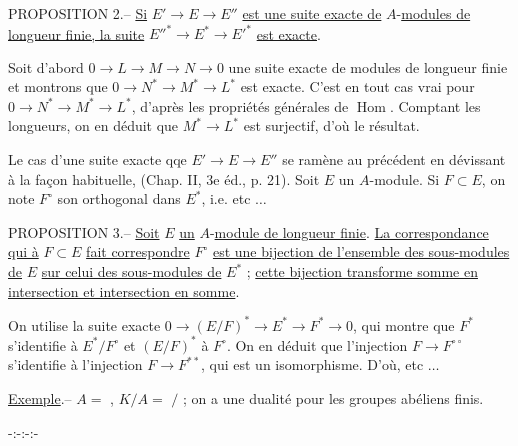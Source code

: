 PROPOSITION 2.-- \uline{Si} $E'\longrightarrow E\longrightarrow E''$ \uline{est une suite exacte de} $A$-\uline{modules de longueur finie, la suite} $E''^*\longrightarrow E^*\longrightarrow E'^*$ \uline{est exacte}.

Soit d'abord $0\longrightarrow L\longrightarrow M\longrightarrow N\longrightarrow0$ une suite exacte de modules de longueur finie et montrons que $0\longrightarrow N^*\longrightarrow M^*\longrightarrow L^*$ est exacte. C'est en tout cas vrai pour $0\longrightarrow N^*\longrightarrow M^*\longrightarrow L^*$, d'après les propriétés générales de $\operatorname{Hom}$. Comptant les longueurs, on en déduit que $M^*\longrightarrow L^*$ est surjectif, d'où le résultat.

Le cas d'une suite exacte qqe $E'\longrightarrow E\longrightarrow E''$ se ramène au précédent en dévissant à la façon habituelle, (Chap. II, 3e éd., p. 21). Soit $E$ un $A$-module. Si $F\subset E$, on note $F^{\circ}$ son orthogonal dans $E^*$, i.e. etc $\ldots$

PROPOSITION 3.-- \uline{Soit} $E$ \uline{un} $A$-\uline{module de longueur finie}. \uline{La correspondance qui à} $F\subset E$ \uline{fait correspondre} $F^{\circ}$ \uline{est une bijection de l'ensemble des sous-modules de} $E$ \uline{sur celui des sous-modules de} $E^*$ ; \uline{cette bijection transforme somme en intersection et intersection en somme}.

On utilise la suite exacte $0\longrightarrow(E/F)^*\longrightarrow E^*\longrightarrow F^*\longrightarrow0$, qui montre que $F^*$ s'identifie à $E^*/F^{\circ}$ et $(E/F)^*$ à $F^{\circ}$. On en déduit que l'injection $F\longrightarrow F^{\circ\circ}$ s'identifie à l'injection $F\longrightarrow F^{**}$, qui est un isomorphisme. D'où, etc $\ldots$

\uline{Exemple}.-- $A=$ , $K/A=$ $/$ ; on a une dualité pour les groupes abéliens finis.

\begin{center}-:-:-:-\end{center}

